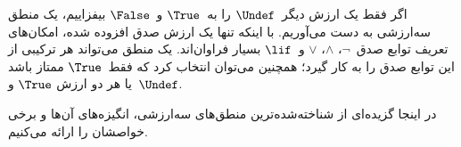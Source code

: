 \documentclass[../../../include/open-logic-section]{subfiles}
\begin{document}


اگر فقط یک ارزش دیگر~$\Undef$ را به~$\True$ و~$\False$ بیفزاییم، یک
منطق سه‌ارزشی به دست می‌آوریم. با اینکه تنها یک ارزش صدق افزوده شده،
امکان‌های تعریف توابع صدق~$\lnot$، $\land$، $\lor$ و~$\lif$ بسیار
فراوان‌اند. یک منطق می‌تواند هر ترکیبی از این توابع صدق را به کار گیرد؛
همچنین می‌توان انتخاب کرد که فقط~$\True$ ممتاز باشد یا هر دو ارزش
$\True$ و~$\Undef$.

در اینجا گزیده‌ای از شناخته‌شده‌ترین منطق‌های سه‌ارزشی، انگیزه‌های آن‌ها
و برخی خواصشان را ارائه می‌کنیم.
\end{document}
